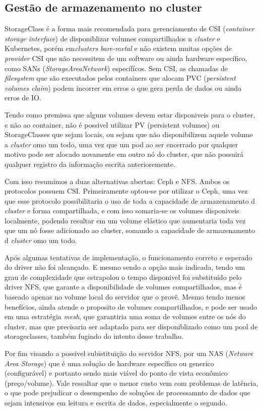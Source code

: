 \subsection{Gestão de armazenamento no cluster}
StorageClass é a forma mais recomendada para gerenciamento de CSI (\emph{container storage interface}) de disponiblizar volumes compartilhados n \emph{cluster} e Kubernetes\textregistered, porém em\emph{clusters }\emph{bare-metal} e não existem muitas opções de \emph{provider} CSI que não necessitem de um software ou ainda hardware específico, como SANs (\emph{StorageAreaNetwork}) específícos. Sem CSI, as chamadas de \emph{filesystem} que são executados pelos containers que alocam PVC (\emph{persistent volumes claim}) podem incorrer em erros o que gera perda de dados ou ainda erros de IO. 


Tendo como premissa que alguns volumes devem estar disponiveis para o cluster, e não ao container, não é possivel utilizar PV (persistent volumes) ou StorageClasses que sejam locais, ou sejam que não disponibilizem aquele volume a \emph{cluster} omo um todo, uma vez que um pod ao ser encerrado por qualquer motivo pode ser alocado novamente em outro nó do cluster, que não possuirá qualquer registro da informação escrita anterioremente. 

Com isso resumimos a duas alternativas abertas: Ceph e NFS. Ambos os protocolos possuem CSI. Primeiramente optou-se por utilizar o Ceph, uma vez que esse protocolo possibilitaria o uso de toda a capacidade de armazenamento d \emph{cluster} e forma compartilhada, e com isso somaria-se os volumes disponiveis localmente, podendo resultar em um volume elástico que aumentaria toda vez que um nó fosse adicionado ao cluster, somando a capacidade de armazenamento d \emph{cluster} omo um todo. 

Após algumas tentativas de implementação, o funcionamento correto e esperado do driver não foi alcançado. E mesmo sendo a opção mais indicada, tendo um grau de complexidade que estrapolou o tempo disponivel foi substituído pelo driver NFS, que garante a disponibilidade de volumes compartilhados, mas é baseado apenas no volume local do servidor que o provê. Mesmo tendo menos benefícios, ainda atende o proposito de volumes compartilhados, e pode ser usado em uma estratégia \emph{mesh}, que garantiria uma soma de volumes entre os nós do cluster, mas que precisaria ser adaptado para ser disponiblizado como um pool de storageclasses, também fugindo do intento desse trabalho.

Por fim visando a possivel subistituição do servidor NFS, por um NAS (\emph{Netware Area Storage}) que é uma solução de hardware específico ou generico (configurável) e portanto sendo mais viável do ponto de vista econômico (preço/volume). Vale ressaltar que o menor custo vem com problemas de latência, o que pode prejudicar o desempenho de soluções de processamnto de dados que sejam intensivos em leitura e escrita de dados, especialmente o segundo.

